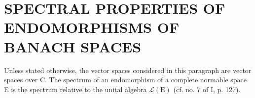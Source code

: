 \section{SPECTRAL PROPERTIES OF ENDOMORPHISMS OF BANACH SPACES}

Unless stated otherwise, the vector spaces considered in this paragraph are vector spaces over C. The spectrum of an endomorphism of a complete normable space E is the spectrum relative to the unital algebra \(\mathcal{L}(\mathrm{E})\) (cf. no. 7 of I, p. 127).

